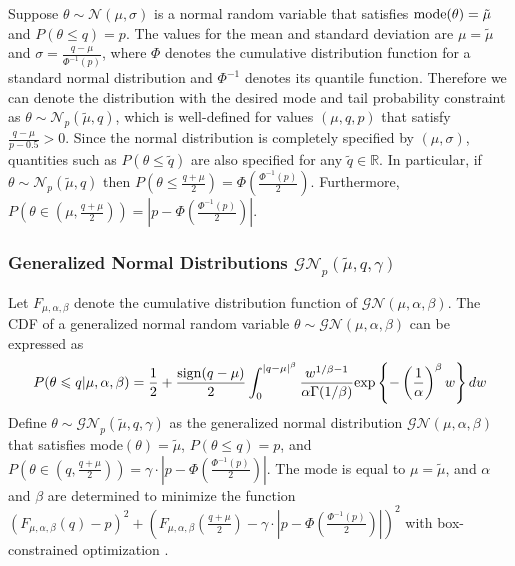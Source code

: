 \documentclass[useAMS,usenatbib,referee]{biom}
\begin{document}
Suppose $\theta\sim\mathcal{N}(\mu,\sigma)$ is a normal random variable that satisfies ${\mathrm{mode}}(\theta)=\tilde{\mu}$ and $P(\theta\leq q)=p$. The values for the mean and standard deviation are $\mu=\tilde{\mu}$ and $\sigma=\frac{q-\mu}{\Phi^{-1}(p)}$, where $\Phi$ denotes the cumulative distribution function for a standard normal distribution and $\Phi^{-1}$ denotes its quantile function. Therefore we can denote the distribution with the desired mode and tail probability constraint as  $\theta\sim\mathcal{N}_p(\tilde{\mu},q)$, which is well-defined for values $(\mu,q,p)$ that satisfy $\frac{q-\mu}{p-0.5}>0$. Since the normal distribution is completely specified by $(\mu, \sigma)$, quantities such as $P(\theta\leq\tilde{q})$ are also specified for any $\tilde{q}\in\mathbb{R}$. In particular, if $\theta\sim\mathcal{N}_p(\tilde{\mu},q)$ then $P(\theta\leq\frac{q+\mu}{2})=\Phi(\frac{\Phi^{-1}(p)}{2})$. Furthermore, $P(\theta\in(\mu,\frac{q+\mu}{2}))=|p-\Phi(\frac{\Phi^{-1}(p)}{2})|$. 

\subsubsection{Generalized Normal Distributions $\mathcal{GN}_p(\tilde{\mu},q,\gamma)$}\label{sec:gen_norm_appendix}
Let $F_{\mu,\alpha,\beta}$ denote the cumulative distribution function of $\mathcal{GN}(\mu,\alpha,\beta)$. The CDF of a generalized normal random variable $\theta\sim\mathcal{GN}(\mu,\alpha,\beta)$ can be expressed as \citep{Griffin2018}
\begin{equation}
P(\theta\leqslant q|\mu,\alpha,\beta)=\frac{1}{2}+\frac{{\mathrm{sign}}(q-\mu)}{2}\int_0^{|q-\mu|^\beta}\frac{w^{1/\beta-1}}{\alpha\Gamma(1/\beta)}{\mathrm{exp}}\left\{-\left(\frac{1}{\alpha}\right)^\beta w\right\} dw
\end{equation}
Define $\theta\sim\mathcal{GN}_p(\tilde{\mu},q,\gamma)$ as the generalized normal distribution $\mathcal{GN}(\mu,\alpha,\beta)$ that satisfies mode$(\theta)=\tilde{\mu}$, $P(\theta\leq q)=p$, and $P(\theta\in(q,\frac{q+\mu}{2}))=\gamma\cdot|p-\Phi(\frac{\Phi^{-1}(p)}{2})|$.
%
The mode is equal to $\mu=\tilde{\mu}$, and $\alpha$ and $\beta$ are determined to minimize the function $(F_{\mu,\alpha,\beta}(q)-p)^2+(F_{\mu,\alpha,\beta}(\frac{q+\mu}{2})-\gamma\cdot|p-\Phi(\frac{\Phi^{-1}(p)}{2})|)^2$ with box-constrained optimization \citep{Byrd1995}. %
\end{document}
